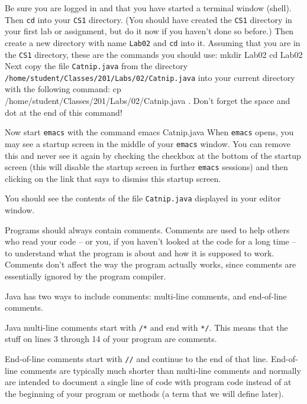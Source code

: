 \documentclass[12pt]{article}
\newcommand{\fname}[1]{\texttt{#1}}
\newcommand{\code}[1]{\texttt{#1}}
\newenvironment{qv}%
  {\quote
   \verbatim}%
  {\endverbatim
   \endquote}
\begin{document}
Be sure you are logged in
and that you have started a terminal window (shell).
Then \fname{cd} into your \fname{CS1} directory.
(You should have created the \fname{CS1} directory in your first lab or assignment,
but do it now if you haven't done so before.)
Then create a new directory with name \fname{Lab02} and \code{cd} into it.
Assuming that you are in the \fname{CS1} directory,
these are the commands you should use:
\begin{qv}
mkdir Lab02
cd Lab02
\end{qv}
Next copy the file \fname{Catnip.java}
from the directory \fname{/home/student/Classes/201/Labs/02/Catnip.java}
into your current directory with the following command:
\begin{qv}
cp /home/student/Classes/201/Labs/02/Catnip.java .
\end{qv}
Don't forget the space and dot at the end of this command!

Now start \fname{emacs} with the command
\begin{qv}
emacs Catnip.java
\end{qv}
When \fname{emacs} opens,
you may see a startup screen in the middle of your \fname{emacs} window.
You can remove this and never see it again
by checking the checkbox at the bottom of the startup screen
(this will disable the startup screen in further \fname{emacs} sessions)
and then clicking on the link that says to dismiss this startup screen.

You should see the contents of the file \fname{Catnip.java} displayed
in your editor window.

Programs should always contain comments.
Comments are used to help others who read your code --
or you, if you haven't looked at the code for a long time --
to understand what the program is about and how it is supposed to work.
Comments don't affect the way the program actually works,
since comments are essentially ignored by the program compiler.

Java has two ways to include comments:
multi-line comments, and end-of-line comments.

Java multi-line comments start with \verb./*. and end with \verb.*/..
This means that the stuff on lines 3 through 14 of your program are comments.

End-of-line comments start with \verb.//.
and continue to the end of that line.
End-of-line comments are typically much shorter
than multi-line comments and normally are intended
to document a single line of code with program code
instead of at the beginning of your program or methods
(a term that we will define later).
\end{document}
